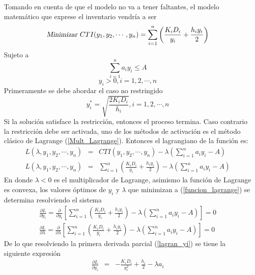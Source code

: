 Tomando en cuenta de que el modelo no va a tener faltantes, el modelo matemático que exprese el inventario vendría a ser
$$
	\textsl{Minimizar }CTI({y}_{1},{y}_{2},\cdots , {y}_{n}) = \sum\limits_{i = 1}^{n} \left(\frac{{K}_{i}{D}_{i}}{{y}_{i}} + \frac{{h}_{i}{y}_{i}}{2} \right)
$$
Sujeto a
$$
\sum\limits_{i = 1}^{n} {a}_{i} {y}_{i} \leq A
$$
$$
{y}_{i} > 0, i = 1, 2, \cdots , n
$$
Primeramente se debe abordar el caso no restringido
$$
{y}_{i}^{*} = \sqrt{\frac{2{K}_{i}{D}_{i}}{{h}_{i}}}, i = 1, 2, \cdots , n
$$
Si la solución satisface la restricción, entonces el proceso termina. Caso contrario la restricción debe ser activada, uno de los métodos de activación es el método clásico de Lagrange (\ref{Mult_Lagrange}). Entonces el lagrangiano de la función es:
\begin{eqnarray}
	\label{funcion_lagrange}
	L(\lambda, {y}_{1}, {y}_{2}, \cdots , {y}_{n}) &=& CTI({y}_{1}, {y}_{2}, \cdots , {y}_{n}) - \lambda \left( \sum\limits_{i = 1}^{n} {a}_{i} {y}_{i} - A \right) \nonumber \\
	L(\lambda, {y}_{1}, {y}_{2}, \cdots , {y}_{n}) &=& \sum\limits_{i = 1}^{n} \left(\frac{{K}_{i}{D}_{i}}{{y}_{i}} + \frac{{h}_{i}{y}_{i}}{2} \right) - \lambda \left( \sum\limits_{i = 1}^{n} {a}_{i} {y}_{i} - A \right)
\end{eqnarray}
En donde $\lambda < 0$ es el multiplicador de Lagrange, asimismo la función de Lagrange es convexa, los valores óptimos de $y_i$ y $\lambda$ que minimizan a (\ref{funcion_lagrange}) se determina resolviendo el sistema
\begin{eqnarray}
	\label{lagran_yi}
	\frac{\partial L}{\partial {y}_{i}} = \frac{\partial}{\partial {y}_{i}} \left[ \sum\limits_{i = 1}^{n} \left(\frac{{K}_{i}{D}_{i}}{{y}_{i}} + \frac{{h}_{i}{y}_{i}}{2} \right) - \lambda \left( \sum\limits_{i = 1}^{n} {a}_{i} {y}_{i} - A \right) \right] = 0 \\
	\label{lagran_lambda}
	\frac{\partial L}{\partial \lambda} = \frac{\partial}{\partial \lambda} \left[ \sum\limits_{i = 1}^{n} \left(\frac{{K}_{i}{D}_{i}}{{y}_{i}} + \frac{{h}_{i}{y}_{i}}{2} \right) - \lambda \left( \sum\limits_{i = 1}^{n} {a}_{i} {y}_{i} - A \right) \right] = 0
\end{eqnarray}
De lo que resolviendo la primera derivada parcial (\ref{lagran_yi}) se tiene la siguiente expresión
\begin{eqnarray}
	\frac{\partial L}{\partial {y}_{i}} &=& - \frac{{K}_{i} {D}_{i}}{{y}_{i}^2} + \frac{{h}_{i}}{2} - \lambda {a}_{i} \nonumber
\end{eqnarray}
